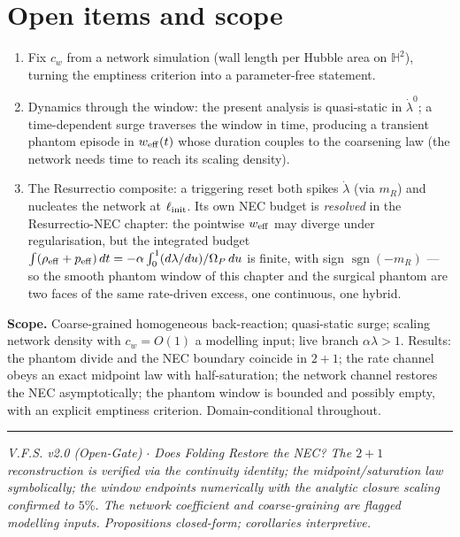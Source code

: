 \documentclass[11pt,a4paper,oneside]{book}
\newcommand{\Op}{\Omega_P}
\newcommand{\ldz}{\dot\lambda^{0}}
\theoremstyle{plain}
\theoremstyle{definition}
\theoremstyle{remark}
\begin{document}
\section{Open items and scope}

\begin{enumerate}[leftmargin=1.6em,itemsep=2pt]
\item Fix $c_w$ from a network simulation (wall length per Hubble area on $\mathbb H^2$), turning the
emptiness criterion into a parameter-free statement.
\item Dynamics through the window: the present analysis is quasi-static in $\ldz$; a time-dependent
surge traverses the window in time, producing a transient phantom episode in $w_{\rm eff}(t)$ whose
duration couples to the coarsening law (the network needs time to reach its scaling density).
\item The Resurrectio composite: a triggering reset both spikes $\dot\lambda$ (via $m_R$) and nucleates
the network at $\ell_{\rm init}$. Its own NEC budget is \emph{resolved} in the Resurrectio-NEC chapter:
the pointwise $w_{\rm eff}$ may diverge under regularisation, but the integrated budget
$\int(\rho_{\rm eff}+p_{\rm eff})\,dt=-\alpha\int_0^1(d\lambda/du)/\Op\,du$ is finite, with sign
$\operatorname{sgn}(-m_R)$ --- so the smooth phantom window of this chapter and the surgical phantom are
two faces of the same rate-driven excess, one continuous, one hybrid.
\end{enumerate}

\textbf{Scope.} Coarse-grained homogeneous back-reaction; quasi-static surge; scaling network density
with $c_w=O(1)$ a modelling input; live branch $\alpha\lambda>1$. Results: the phantom divide and the
NEC boundary coincide in $2{+}1$; the rate channel obeys an exact midpoint law with half-saturation; the
network channel restores the NEC asymptotically; the phantom window is bounded and possibly empty, with
an explicit emptiness criterion. Domain-conditional throughout.

\vspace{0.5em}
\hrule
\smallskip
\noindent\footnotesize\emph{V.F.S. v2.0 (Open-Gate) $\cdot$ Does Folding Restore the NEC? The $2{+}1$
reconstruction is verified via the continuity identity; the midpoint/saturation law symbolically; the
window endpoints numerically with the analytic closure scaling confirmed to $5\%$. The network
coefficient and coarse-graining are flagged modelling inputs. Propositions closed-form; corollaries
interpretive.}
\end{document}
